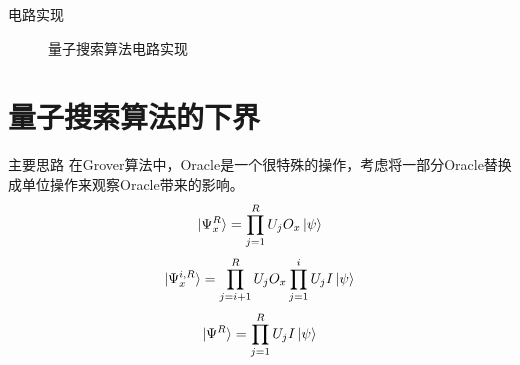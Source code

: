 \documentclass{beamer}
\begin{document}
\begin{frame}{电路实现}
    \begin{figure}
        \centering
        \caption{量子搜索算法电路实现}
    \end{figure}
\end{frame}



\section{量子搜索算法的下界}

\begin{frame}{主要思路}
    在Grover算法中，Oracle是一个很特殊的操作，考虑将一部分Oracle替换成单位操作来观察Oracle带来的影响。
    \begin{equation}
        \ket{\Psi_{x}^{R}}=\prod_{j=1}^{R}U_{j}O_{x}\ket{\psi}
    \end{equation}
    \begin{equation}
        \ket{\Psi_{x}^{i,R}}=\prod_{j=i+1}^{R}U_{j}O_{x}\prod_{j=1}^{i}U_{j}I\ket{\psi}
    \end{equation}
    \begin{equation}
        \ket{\Psi^{R}}=\prod_{j=1}^{R}U_{j}I\ket{\psi}
    \end{equation}
\end{frame}
\end{document}
